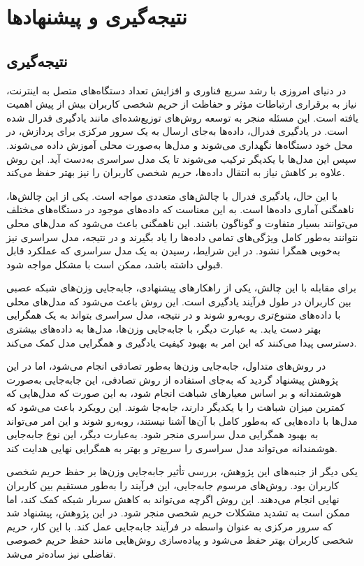 \chapter{نتیجه‌گیری و پیشنهاد‌ها}

\section{نتیجه‌گیری}

در دنیای امروزی با رشد سریع فناوری و افزایش تعداد دستگاه‌های متصل به اینترنت، نیاز به برقراری ارتباطات مؤثر و حفاظت از حریم شخصی کاربران بیش از پیش اهمیت یافته است. این مسئله منجر به توسعه روش‌های توزیع‌شده‌ای مانند یادگیری فدرال شده است. در یادگیری فدرال، داده‌ها به‌جای ارسال به یک سرور مرکزی برای پردازش، در محل خود دستگاه‌ها نگهداری می‌شوند و مدل‌ها به‌صورت محلی آموزش داده می‌شوند. سپس این مدل‌ها با یکدیگر ترکیب می‌شوند تا یک مدل سراسری به‌دست آید. این روش علاوه بر کاهش نیاز به انتقال داده‌ها، حریم شخصی کاربران را نیز بهتر حفظ می‌کند.

با این حال، یادگیری فدرال با چالش‌های متعددی مواجه است. یکی از این چالش‌ها، ناهمگنی آماری داده‌ها است. به این معناست که داده‌های موجود در دستگاه‌های مختلف می‌توانند بسیار متفاوت و گوناگون باشند. این ناهمگنی باعث می‌شود که مدل‌های محلی نتوانند به‌طور کامل ویژگی‌های تمامی داده‌ها را یاد بگیرند و در نتیجه، مدل سراسری نیز به‌خوبی همگرا نشود. در این شرایط، رسیدن به یک مدل سراسری که عملکرد قابل قبولی داشته باشد، ممکن است با مشکل مواجه شود.

برای مقابله با این چالش، یکی از راهکارهای پیشنهادی، جابه‌جایی وزن‌های شبکه عصبی بین کاربران در طول فرآیند یادگیری است. این روش باعث می‌شود که مدل‌های محلی با داده‌های متنوع‌تری روبه‌رو شوند و در نتیجه، مدل سراسری بتواند به یک همگرایی بهتر دست یابد. به عبارت دیگر، با جابه‌جایی وزن‌ها، مدل‌ها به داده‌های بیشتری دسترسی پیدا می‌کنند که این امر به بهبود کیفیت یادگیری و همگرایی مدل کمک می‌کند.

در روش‌های متداول، جابه‌جایی وزن‌ها به‌طور تصادفی انجام می‌شود، اما در این پژوهش پیشنهاد گردید که به‌جای استفاده از روش تصادفی، این جابه‌جایی به‌صورت هوشمندانه و بر اساس معیارهای شباهت انجام شود، به این صورت که مدل‌هایی که کمترین میزان شباهت را با یکدیگر دارند، جابه‌جا شوند. این رویکرد باعث می‌شود که مدل‌ها با داده‌هایی که به‌طور کامل با آن‌ها آشنا نیستند، روبه‌رو شوند و این امر می‌تواند به بهبود همگرایی مدل سراسری منجر شود. به‌عبارت دیگر، این نوع جابه‌جایی هوشمندانه می‌تواند مدل سراسری را سریع‌تر و بهتر به همگرایی نهایی هدایت کند.

یکی دیگر از جنبه‌های این پژوهش، بررسی تأثیر جابه‌جایی وزن‌ها بر حفظ حریم شخصی کاربران بود. روش‌های مرسوم جابه‌جایی، این فرآیند را به‌طور مستقیم بین کاربران نهایی انجام می‌دهند. این روش اگرچه می‌تواند به کاهش سربار شبکه کمک کند، اما ممکن است به تشدید مشکلات حریم شخصی منجر شود. در این پژوهش، پیشنهاد شد که سرور مرکزی به عنوان واسطه در فرآیند جابه‌جایی عمل کند. با این کار، حریم شخصی کاربران بهتر حفظ می‌شود و پیاده‌سازی روش‌هایی مانند حفظ حریم خصوصی تفاضلی نیز ساده‌تر می‌شد.

